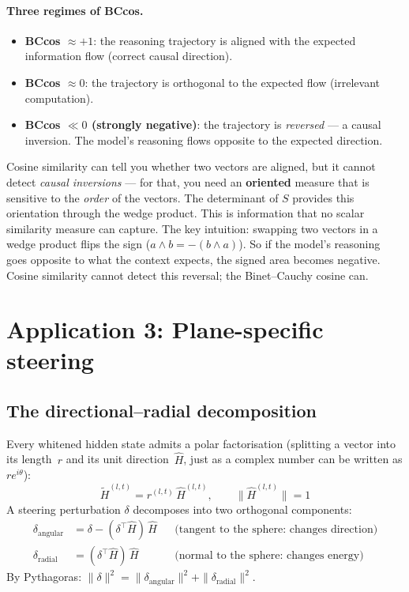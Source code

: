 \documentclass[11pt, twoside, openright]{memoir}
\begin{document}
\paragraph{Three regimes of BCcos.}
\begin{itemize}[nosep]
\item \textbf{BCcos $\approx +1$}: the reasoning trajectory is aligned
  with the expected information flow (correct causal direction).
\item \textbf{BCcos $\approx 0$}: the trajectory is orthogonal to
  the expected flow (irrelevant computation).
\item \textbf{BCcos $\ll 0$ (strongly negative)}: the trajectory is
  \emph{reversed} --- a causal inversion.  The model's reasoning
  flows opposite to the expected direction.
\end{itemize}

\begin{keyidea}
Cosine similarity can tell you whether two vectors are aligned, but it
cannot detect \emph{causal inversions} --- for that, you need an
\textbf{oriented} measure that is sensitive to the \emph{order} of the
vectors.  The determinant of $S$ provides this orientation through the
wedge product.  This is information that no scalar similarity measure
can capture.
The key intuition: swapping two vectors in a wedge product flips the sign ($a \wedge b = -(b \wedge a)$). So if the model's reasoning goes opposite to what the context expects, the signed area becomes negative. Cosine similarity cannot detect this reversal; the Binet--Cauchy cosine can.
\end{keyidea}

\section{Application 3: Plane-specific steering}
\label{sec:steering}

\subsection{The directional--radial decomposition}

Every whitened hidden state admits a polar factorisation (splitting a vector into its length~$r$ and its unit direction~$\hat{H}$, just as a complex number can be written as $r e^{i\theta}$):
\[
  \widetilde{H}^{(l,t)} = r^{(l,t)} \, \hat{H}^{(l,t)},
  \qquad \|\hat{H}^{(l,t)}\| = 1
\]
A steering perturbation $\delta$ decomposes into two orthogonal
components:
\begin{align*}
  \delta_{\text{angular}} &= \delta - (\delta^\top \hat{H})\,\hat{H}
  &&\text{(tangent to the sphere: changes direction)} \\
  \delta_{\text{radial}} &= (\delta^\top \hat{H})\,\hat{H}
  &&\text{(normal to the sphere: changes energy)}
\end{align*}
By Pythagoras:
$\|\delta\|^2 = \|\delta_{\text{angular}}\|^2 +
\|\delta_{\text{radial}}\|^2$.
\end{document}
